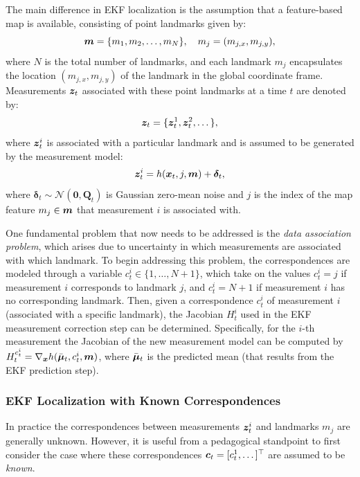 The main difference in EKF localization is the assumption that a feature-based map is available, consisting of point landmarks given by:
\begin{equation*}
\bm{m} = \{m_1, m_2, \dots, m_N\}, \quad m_j = (m_{j,x}, m_{j,y}),
\end{equation*}
where $N$ is the total number of landmarks, and each landmark $m_j$ encapsulates the location $(m_{j,x}, m_{j,y})$ of the landmark in the global coordinate frame. Measurements $\bm{z}_t$ associated with these point landmarks at a time $t$ are denoted by:
\begin{equation*}
\bm{z}_t = \{\bm{z}_t^1, \bm{z}_t^2, \dots \},
\end{equation*}
where $\bm{z}_t^i$ is associated with a particular landmark and is assumed to be generated by the measurement model:
\begin{equation*}
\bm{z}^i_t = h(\bm{x}_t, j, \bm{m}) + \bm{\delta}_t,
\end{equation*}
where $\bm{\delta}_t \sim \mathcal{N}(\bm{0}, \bm{Q}_t)$ is Gaussian zero-mean noise and $j$ is the index of the map feature $m_j \in \bm{m}$ that measurement $i$ is associated with.

One fundamental problem that now needs to be addressed is the \textit{data association problem}, which arises due to uncertainty in which measurements are associated with which landmark. To begin addressing this problem, the correspondences are modeled through a variable $c_t^i \in \{1,\dots,N+1\}$, which take on the values $c_t^i = j$ if measurement $i$ corresponds to landmark $j$, and $c_t^i = N + 1$ if measurement $i$ has no corresponding landmark. 
Then, given a correspondence $c^i_t$ of measurement $i$ (associated with a specific landmark), the Jacobian $H^i_t$ used in the EKF measurement correction step can be determined. Specifically, for the $i$-th measurement the Jacobian of the new measurement model can be computed by $H^{c^i_t}_t = \nabla_{\bm{x}}h(\bar{\bm{\mu}}_t,c^i_t,\bm{m})$, where $\bar{\bm{\mu}}_t$ is the predicted mean (that results from the EKF prediction step).


\subsubsection{EKF Localization with Known Correspondences}
In practice the correspondences between measurements $\bm{z}^i_t$ and landmarks $m_j$ are generally unknown. However, it is useful from a pedagogical standpoint to first consider the case where these correspondences $\bm{c}_t = [c_t^1,\dots]^\top $ are assumed to be \textit{known}.

